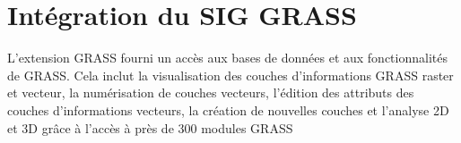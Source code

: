 
\section{Int\'egration du SIG GRASS}\label{sec:grass}


L'extension GRASS fourni un acc\`es aux bases de donn\'ees et aux fonctionnalit\'es de GRASS. Cela inclut la visualisation des couches d'informations GRASS raster et vecteur, la num\'erisation de couches vecteurs, l'\'edition des attributs des couches d'informations vecteurs, la cr\'eation de nouvelles couches et l'analyse 2D et 3D gr\^ace \`a l'acc\`es \`a pr\`es de 300 modules GRASS

